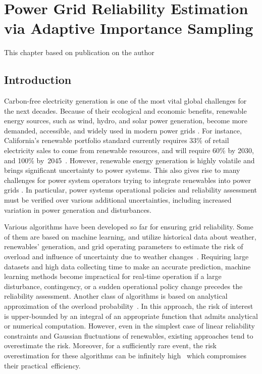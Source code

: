 \chapter{Power Grid Reliability Estimation via Adaptive Importance Sampling}
\label{chap:sampling}
This chapter based on publication on the author 
\section{Introduction}
\label{sampling:introduction}

Carbon-free electricity generation is one of the most vital global challenges for the next decades. Because of their ecological and economic benefits, renewable energy sources, such as wind, hydro, and solar power generation, become more demanded, accessible, and widely used in modern power grids \cite{harjanne2019abandoning}. For instance, California's renewable portfolio standard currently requires 33\% of retail electricity sales to come from renewable resources, and will require 60\% by 2030, and 100\% by~2045~\cite{golden2003senate}.
However, renewable energy generation is highly volatile and brings significant uncertainty to power systems. This also gives rise to many challenges for power system operators trying to integrate renewables into power grids \cite{schmietendorf2017impact}. In particular, power systems operational policies and reliability assessment must be verified over various additional uncertainties, including increased variation in power generation and disturbances. 

Various algorithms have been developed so far for ensuring grid reliability. Some of them are based on machine learning, and utilize historical data about weather, renewables' generation, and grid operating parameters to estimate the risk of overload and influence of uncertainty due to weather changes~\cite{zhang2017data}. %
Requiring large datasets and high data collecting time to make an accurate prediction, machine learning methods become impractical for real-time operation if a large disturbance, contingency, or a sudden operational policy change precedes the reliability assessment. Another class of algorithms is based on analytical approximation of the overload probability~\cite{nemirovski2007convex}. In this approach, the risk of interest is upper-bounded by an integral of an appropriate function that admits analytical or numerical computation. However, even in the simplest case of linear reliability constraints and Gaussian fluctuations of renewables, existing approaches tend to overestimate the risk. Moreover, for a sufficiently rare event, the risk overestimation for these algorithms can be infinitely high~\cite{nemirovski2007convex} which compromises their practical~efficiency. 

